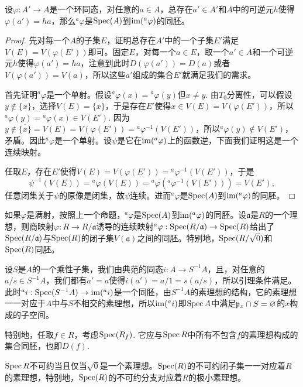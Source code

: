 \begin{lem}\label{lem:3.9}
设$\varphi:A'\to A$是一个环同态，对任意的$a\in A$，总存在$a'\in A'$和$A$中的可逆元$h$使得$\varphi(a')=ha$，那么$^a\varphi$是$\operatorname{Spec}(A)$到$\operatorname{im} (^a\varphi)$的同胚。
\end{lem}

\begin{proof} 先对每一个$A$的子集$E$，证明总存在$A'$中的一个子集$E'$满足$V(E)=V(\varphi(E'))$即可。固定$E$，对每一个$a\in E$，取一个$a'\in A$和一个可逆元$h$使得$\varphi(a')=ha$，注意到此时$D(\varphi(a'))=D(a)$或者$V(\varphi(a'))=V(a)$，所以这些$a'$组成的集合$E'$就满足我们的需求。

首先证明$^a\varphi$是一个单射。假设$^a\varphi(x)={}^a\varphi(y)$但$x\neq y$. 由$T_0$分离性，可以假设$y\not\in \overline{\{x\}}$，选择$V(E)=\overline{\{x\}}$，于是存在$E'$使得$x\in V(E)=V(\varphi(E'))$，所以${}^a\varphi(y)={}^a\varphi(x)\in V(E')$. 因为$y\not\in \overline{\{x\}}=V(E)=V(\varphi(E'))={}^a\varphi^{-1}(V(E'))$，所以${}^a\varphi(y)\not\in V(E')$，矛盾。因此$^a\varphi$是一个单射。设$\psi$是它在$\operatorname{im} (^a\varphi)$上的函数逆，下面我们证明这是一个连续映射。

任取$E$，存在$E'$使得$V(E)=V(\varphi(E'))={}^a\varphi^{-1}(V(E'))$，于是
\[
	\psi^{-1}(V(E))={}^a\varphi(V(E))={}^a\varphi({}^a\varphi^{-1}(V(E')))=V(E'),
\]
任意闭集关于$\psi$的原像是闭集，故$\psi$连续。进而$^a\varphi$是$\operatorname{Spec}(A)$到$\operatorname{im} (^a\varphi)$的同胚。\end{proof}

如果$\varphi$是满射，按照上一个命题，$^a\varphi$是$\operatorname{Spec}(A)$到$\operatorname{im} (^a\varphi)$的同胚。设$\mathfrak{a}$是$R$的一个理想，则商映射$\varphi:R\to R/\mathfrak{a}$诱导的连续映射$^a\varphi:\operatorname{Spec}(R/\mathfrak{a})\to \operatorname{Spec}(R)$给出了$\operatorname{Spec}(R/\mathfrak{a})$与$\operatorname{Spec}(R)$的闭子集$V(\mathfrak{a})$之间的同胚。特别地，$\operatorname{Spec}(R/\sqrt{0})$和$\operatorname{Spec}(R)$同胚。

设$S$是$A$的一个乘性子集，我们由典范的同态$i:A\to S^{-1}A$，且，对任意的$a/s\in S^{-1}A$，我们都有$a'=a$使得$i(a')=a/1=s(a/s)$，所以引理条件满足。此时${}^ai:\operatorname{Spec}(S^{-1}A)\to \operatorname{im} ({}^ai)$是一个同胚，由$S^{-1}A$的素理想的结构，它的素理想一一对应于$A$中与$S$不相交的素理想，所以$\operatorname{im} ({}^ai)$即$\operatorname{Spec} A$中满足$\mathfrak{p}_x\cap S=\varnothing$的$x$构成的子空间。

特别地，任取$f\in R$，考虑$\operatorname{Spec}(R_f)$. 它应与$\operatorname{Spec} R$中所有不包含$f$的素理想构成的集合同胚，也即$D(f)$. 

\begin{pro}
$\operatorname{Spec} R$不可约当且仅当$\sqrt{0}$是一个素理想。$\operatorname{Spec}(R)$的不可约闭子集一一对应着$R$的素理想，特别地，$\operatorname{Spec}(R)$的不可约分支对应着$R$的极小素理想。
\end{pro}

